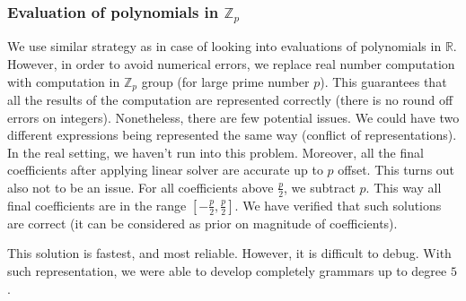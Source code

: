 \subsubsection{Evaluation of polynomials in $\mathbb{Z}_p$}
We use similar strategy as in case of looking into evaluations of polynomials in $\mathbb{R}$. However, in order
to avoid numerical errors, we replace real number computation with computation in $\mathbb{Z}_p$ group (for large prime number $p$). This
guarantees that all the results of the computation are represented correctly (there is no round off errors on integers). Nonetheless, there are few potential
issues. We could have two different expressions being represented the same way (conflict of representations). In the
real setting, we haven't run into this problem. Moreover, all the final coefficients after applying linear solver are
accurate up to $p$ offset. This turns out also not to be an issue. For all coefficients above $\frac{p}{2}$, we subtract $p$. 
This way all final coefficients are in the range $[-\frac{p}{2}, \frac{p}{2}]$. We have verified that such solutions are correct
(it can be considered as prior on magnitude of coefficients). 

This solution is fastest, and most reliable. However, it is difficult to debug. With such representation, we were able to
develop completely grammars up to degree $5$.

